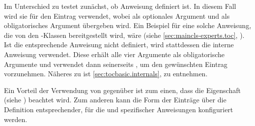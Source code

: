 Im Unterschied zu  testet 
zunächst, ob Anweisung 
definiert ist. In diesem Fall wird sie für den Eintrag verwendet, wobei
 als optionales Argument und  als
obligatorisches Argument übergeben wird. Ein Beispiel für eine solche
Anweisung, die von den \KOMAScript-Klassen bereitgestellt wird, wäre
 (siehe
\autoref{sec:maincls-experts.toc},
). Ist die entsprechende
Anweisung nicht definiert, wird stattdessen die interne Anweisung
 verwendet. Diese erhält
alle vier Argumente als obligatorische Argumente und verwendet dann
seinerseits , um den gewünschten Eintrag
vorzunehmen. Näheres zu  ist
\autoref{sec:tocbasic.internals},
 zu entnehmen.

Ein Vorteil der Verwendung von  gegenüber
 ist zum einen, dass die Eigenschaft
 (siehe ) beachtet
wird. Zum anderen kann die Form der Einträge über die Definition
entsprechender, für die  und 
spezifischer Anweisungen konfiguriert werden.%
%
\EndIndexGroup


